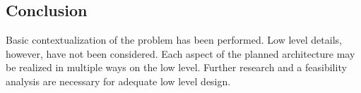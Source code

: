 \subsection{Conclusion}
Basic contextualization of the problem has been performed.
Low level details, however, have not been considered.
Each aspect of the planned architecture may be realized in multiple ways on the low level.
Further research and a feasibility analysis are necessary for adequate low level design.
